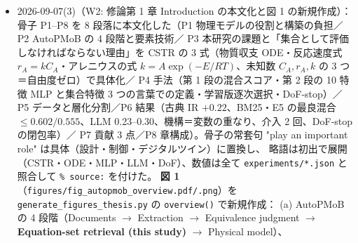\documentclass[11pt,a4paper]{jsarticle}
\begin{document}
\begin{itemize}[nosep]
    (2) 何が分かったか＝貢献 3 点（可解性を保証したベンチマーク／Recall@K 0.521$\to$0.743・0.466$\to$0.689、BM25・E5 の最良混合 $\le 0.602/0.555$、LLM 0.23--0.30／
    機構＝変数の重なり・話題は第 1 段の後で冗長、介入 2 回＝学習版逐次 $+0.056$（X$\ge$8）・第 1 段再設計 0.780、DoF-stop 閉包率 94\%/88\% vs oracle 87\%/78\%）、
    (3) 限界からの今後の課題 3 方向（scheduled sampling と「式がどの変数を決めるか」の新特徴／DB 外の式・異なる記法を含む実タスクでの検証／AutoPMoB パイプラインへの統合＝抽出・等価判定の下流、シミュレータの上流）。
    「第 1 段の再設計」は A1 で実施済みのため将来課題から外し介入として記載（ギャップ分析 W3 の指示）。
    \textbf{Abstract} を初稿から全面書き直し（3 段落・約 300 語: 問題と課題／手法とデータ／結果・機構・介入・自己停止）。
    閉包率の表記は第 1 章・第 7 章・Abstract で「94\% in the mixed setting and 88\% in the synthesized-only setting（oracle 87\% / 78\%）」に統一
    （第 1 章 P6 の「0.88 and 0.94」は設定 B$\to$A 順で紛らわしかったため設定名付きに修正）。数値は第 6 章と同じ一次データ（\texttt{\% source:} 付き）。
    \texttt{latexmk -gg} exit 0・30 ページ・未定義参照なし・Overfull は既存 1 件のみ。これで第 1--7 章と Abstract の全てが本文化された。
    設計書 \texttt{docs/superpowers/specs/2026-09-07-w3-conclusion-abstract-design.md}。残: B1（LLM 判定の検証）・B2（K\_REF 感度）・W4（付録転記）・W5（圧縮設定復元）・W6（D チェック）。
  \item 2026-09-07(3)（W2: 修論第 1 章 Introduction の本文化と図 1 の新規作成）：
    骨子 P1--P8 を 8 段落に本文化した（P1 物理モデルの役割と構築の負担／P2 AutoPMoB の 4 段階と要素技術／
    P3 本研究の課題と「集合として評価しなければならない理由」を CSTR の 3 式（物質収支 ODE・反応速度式 $r_A = kC_A$・アレニウスの式 $k = A\exp(-E/RT)$、未知数 $C_A, r_A, k$ の 3 つ＝自由度ゼロ）で具体化／
    P4 手法（第 1 段の混合スコア・第 2 段の 10 特徴 MLP と集合特徴 3 つの言葉での定義・学習版逐次選択・DoF-stop）／
    P5 データと層化分割／P6 結果（古典 IR $+0.22$、BM25・E5 の最良混合 $\le 0.602 / 0.555$、LLM 0.23--0.30、機構＝変数の重なり、介入 2 回、DoF-stop の閉包率）／
    P7 貢献 3 点／P8 章構成）。骨子の常套句 "play an important role" は具体（設計・制御・デジタルツイン）に置換し、
    略語は初出で展開（CSTR・ODE・MLP・LLM・DoF）、数値は全て \texttt{experiments/*.json} と照合して \texttt{\% source:} を付けた。
    \textbf{図 1}（\texttt{figures/fig\_autopmob\_overview.pdf/.png}）を \texttt{generate\_figures\_thesis.py} の \texttt{overview()} で新規作成：
    (a) AutoPMoB の 4 段階（Documents $\to$ Extraction $\to$ Equivalence judgment $\to$ \textbf{Equation-set retrieval (this study)} $\to$ Physical model）、

\end{itemize}
\end{document}

